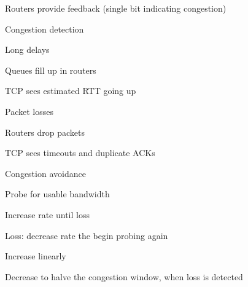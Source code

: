 		\enumstart
			\item Routers provide feedback (single bit indicating congestion)
		\enumend
		\item Congestion detection
		\enumstart
			\item Long delays
			\enumstart
				\item Queues fill up in routers
				\item TCP sees estimated RTT going up
			\enumend
			\item Packet losses
			\enumstart
				\item Routers drop packets
				\item TCP sees timeouts and duplicate ACKs
			\enumend
		\enumend
		\item Congestion avoidance
		\enumstart
			\item Probe for usable bandwidth
			\enumstart
				\item Increase rate until loss
				\item Loss: decrease rate the begin probing again
				\item Increase linearly
				\item Decrease to halve the congestion window, when loss is detected
			\enumend
		\enumend
	\enumend
\enumend
